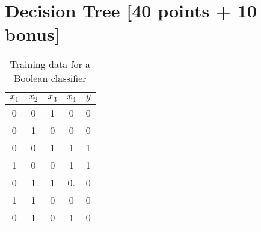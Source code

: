 \documentclass[12pt, fullpage,letterpaper]{article}
\begin{document}
\section{Decision Tree [40 points + 10 bonus]}
\begin{table}[h]
	\centering
	\begin{tabular}{cccc|c}
		$x_1$ & $x_2$ & $x_3$ & $x_4$ & $y$\\ 
		\hline\hline
		0 & 0 & 1 & 0 & 0 \\ \hline
		0 & 1 & 0 & 0 & 0 \\ \hline
		0 & 0 & 1 & 1 & 1 \\ \hline
		1 & 0 & 0 & 1 & 1 \\ \hline
		0 & 1 & 1 & 0.& 0\\ \hline
		1 & 1 & 0 & 0 & 0\\ \hline
		0 & 1 & 0 & 1 & 0\\ \hline
	\end{tabular}
	\caption{Training data for a Boolean classifier}
\end{table}
\end{document}

